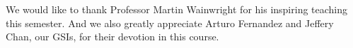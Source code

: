 \documentclass[preprint,12pt,3p]{elsarticle}
\begin{document}
We would like to thank Professor Martin Wainwright for his inspiring teaching this semester. And we also greatly appreciate Arturo Fernandez and Jeffery Chan, our GSIs, for their devotion in this course.

\appendix
\tiny









% 
% 
% 
% 
% 
% 
% 
% 
% 
% 
% 
% 


\end{document}
